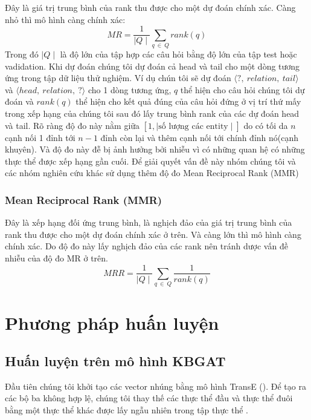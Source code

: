Đây là giá trị trung bình của rank thu được cho một dự đoán chính xác. Càng nhỏ thì mô hình càng chính xác:
\[MR = \frac{1}{\mid Q \mid} \sum_{q ~\in~ Q} rank(q) \]
Trong đó \(\mid Q \mid\) là độ lớn của tập hợp các câu hỏi bằng độ lớn của tập test hoặc vadidation. Khi dự đoán chúng tôi dự đoán cả head và tail cho một dòng tương ứng trong tập dữ liệu thử nghiệm. Ví dụ chún tôi sẽ dự đoán \(\langle ?,~ relation,~ tail \rangle\) và \(\langle head,~ relation,~ ?\rangle\) cho 1 dòng tương ứng, \(q\) thể hiện cho câu hỏi chúng tôi dự đoán và \(rank(q)\) thể hiện cho kết quả đúng của câu hỏi đứng ở vị trí thứ mấy trong xếp hạng của chúng tôi sau đó lấy trung bình rank của các dự đoán head và tail. Rõ ràng độ đo này nằm giữa \([1, \mid \text{số lượng các entity} \mid]\) do có tối da \(n\) cạnh nối 1 đỉnh tới \(n-1\) đỉnh còn lại và thêm cạnh nối tới chính đỉnh nó(cạnh khuyên). Và độ đo này đễ bị ảnh hưởng bởi nhiễu vì có những quan hệ có những thực thể được xếp hạng gần cuối. Để giải quyết vấn đề này nhóm chúng tôi và các nhóm nghiên cứu khác sử dụng thêm độ đo Mean Reciprocal Rank (MMR)

\subsubsection{Mean Reciprocal Rank (MMR)}

Đây là xếp hạng đối ứng trung bình, là nghịch đảo của giá trị trung bình của rank thu được cho một dự đoán chính xác ở trên. Và càng lớn thì mô hình càng chính xác. Do độ đo này lấy nghịch đảo của các rank nên tránh dược vấn đề nhiễu của độ đo MR ở trên.
\[MRR =\frac{1}{\mid Q \mid} \sum_{q~ \in ~Q} \frac{1}{rank(q)}\]

\section{Phương pháp huấn luyện}



\subsection{Huấn luyện trên mô hình KBGAT}

Đầu tiên chúng tôi khởi tạo các vector nhúng bằng mô hình TransE (\cite{bordes2013translating}). Để tạo ra các bộ ba không hợp lệ, chúng tôi thay thế các thực thể đầu và thực thể đuôi bằng một thực thể khác được lấy ngẫu nhiên trong tập thực thể .

